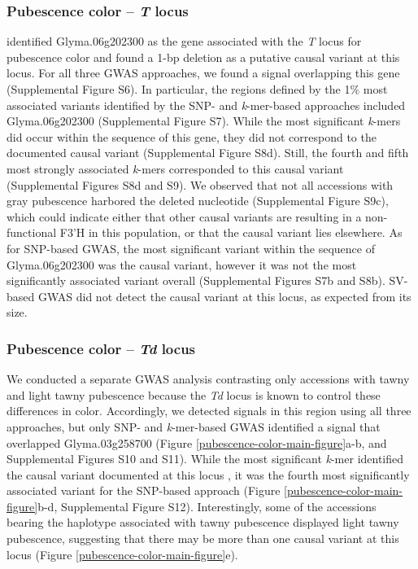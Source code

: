 \documentclass{article}
\begin{document}
\subsubsection*{Pubescence color -- \textit{T} locus}

 identified Glyma.06g202300 as the gene associated with the
\textit{T} locus for pubescence color and found a 1-bp deletion as a putative
causal variant at this locus. For all three GWAS approaches, we found a signal
overlapping this gene (Supplemental Figure S6). In
particular, the regions defined by the 1\% most associated variants
identified by the SNP- and \textit{k}-mer-based approaches included
Glyma.06g202300 (Supplemental Figure S7). While the most
significant \textit{k}-mers did occur within the sequence of this gene, they
did not correspond to the documented causal variant (Supplemental Figure
S8d).  Still, the fourth and fifth most strongly
associated \textit{k}-mers corresponded to this causal variant (Supplemental Figures
S8d and S9). We
observed that not all accessions with gray pubescence harbored the deleted
nucleotide (Supplemental Figure S9c), which could indicate
either that other causal variants are resulting in a non-functional F3’H in
this population, or that the causal variant lies elsewhere. As for SNP-based GWAS,
the most significant variant within the sequence of Glyma.06g202300 was the
causal variant, however it was not the most significantly associated variant
overall (Supplemental Figures S7b and
S8b). SV-based GWAS did not detect the causal variant
at this locus, as expected from its size.

\subsubsection*{Pubescence color -- \textit{Td} locus}

We conducted a separate GWAS analysis contrasting only accessions with tawny
and light tawny pubescence because the \textit{Td} locus is known to control
these differences in color. Accordingly, we detected signals in this region
using all three approaches, but only SNP- and \textit{k}-mer-based GWAS
identified a signal that overlapped Glyma.03g258700 (Figure
\ref{pubescence-color-main-figure}a-b, and Supplemental Figures S10 and
S11).  While the most significant
\textit{k}-mer identified the causal variant documented at this locus
, it was the fourth most significantly associated variant for
the SNP-based approach (Figure \ref{pubescence-color-main-figure}b-d, Supplemental Figure 
S12).  Interestingly, some of the accessions
bearing the haplotype associated with tawny pubescence displayed light tawny
pubescence, suggesting that there may be more than one causal variant at this
locus (Figure \ref{pubescence-color-main-figure}e).
\end{document}
